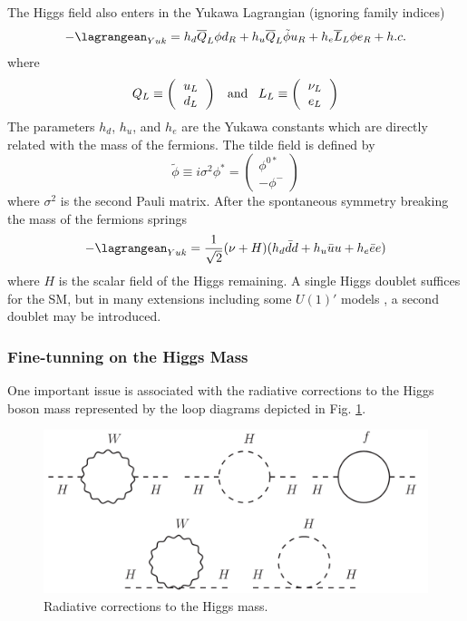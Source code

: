 The Higgs field also enters in the Yukawa Lagrangian (ignoring family indices)
\begin{equation}
-\lagrangean_{Yuk} = h_d \overline{Q}_L\phi d_R + h_u\overline{Q}_L\tilde{\phi}u_R + h_e \overline{L}_L\phi e_R  + h.c.
\end{equation}
where 
\[
Q_L \equiv \left(\begin{tabular}{c} $u_L$ \\ $d_L$ \end{tabular}\right) \;\;\; \mbox{and}  \;\;\;  L_L \equiv \left(\begin{tabular}{c} $\nu_L$ \\ $e_L$ \end{tabular}\right)
\]
The parameters $h_d$, $h_u$, and $h_e$ are the Yukawa constants which are directly related with the mass of the fermions. The tilde field is defined by
\begin{equation}
\tilde{\phi}\equiv i\sigma^2\phi^*=\left(\begin{matrix} \phi^{0*} \\ -\phi^- \end{matrix} \right)
\end{equation}
where $\sigma^2$ is the second Pauli matrix. After the spontaneous symmetry breaking the mass of the fermions springs
\begin{equation}
-\lagrangean_{Yuk}=\frac{1}{\sqrt{2}}(\nu+H)(h_d\bar{d}d + h_u\bar{u}u + h_e\bar{e}e)
\end{equation}
where $H$ is the scalar field of the Higgs remaining. A single Higgs doublet suffices for the SM, but in many extensions including some $U(1)'$ models \cite{Langacker:2010zza}, a second doublet may be introduced.

\subsubsection*{Fine-tunning on the Higgs Mass}

One important issue is associated with the radiative corrections to the Higgs boson mass represented by the loop diagrams depicted in Fig. \ref{higgsVirtual}.  
\begin{figure}[htb!!]
\centering
\includegraphics[scale=0.5]{figures/theory/Higgs_Virtual.pdf}
\caption[Radiative corrections to the Higgs mass]{Radiative corrections to the Higgs mass.}
\label{higgsVirtual}
\end{figure}


